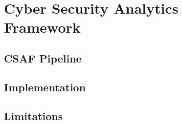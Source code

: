 
\chapter{Cyber Security Analytics Framework}

\section{CSAF Pipeline}\label{sec:csaf:pipeline}

\section{Implementation}\label{sec:csaf:implementation}

\section{Limitations}\label{sec:csaf:limits}